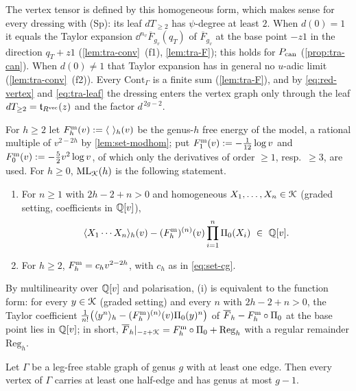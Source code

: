 The vertex tensor is defined by this homogeneous form, which makes sense for every dressing with (Sp): its leaf $dT_{\geq 2}$ has $\psi$-degree at least $2$. When $d(0) = 1$ it equals the Taylor expansion $\dd^{n_v}\overline F_{g_v}(q_T)$ of $\overline F_{g_v}$ at the base point $-z1$ in the direction $q_T+z1$ (\cref{lem:tra-conv}~(f1), \cref{lem:tra-F}); this holds for $P_{\mathrm{can}}$ (\cref{prop:tra-can}). When $d(0)\neq 1$ that Taylor expansion has in general no $u$-adic limit (\cref{lem:tra-conv}~(f2)). Every $\mathrm{Cont}_\Gamma$ is a finite sum (\cref{lem:tra-F}), and by \eqref{eq:red-vertex} and \eqref{eq:tra-leaf} the dressing enters the vertex graph only through the leaf $dT_{\geq 2} = \mathfrak{t}_{R^{\mathrm{vec}}}(z)$ and the factor $d^{\,2g-2}$.

\begin{defn}
\label{def:red-ML}
For $h\geq 2$ let $F^{\mathrm{m}}_h(v) := \langle\ \rangle_h(v)$ be the genus-$h$ free energy of the model, a rational multiple of $v^{2-2h}$ by \cref{lem:set-modhom}; put $F^{\mathrm{m}}_1(v) := -\frac{1}{12}\log v$ and $F^{\mathrm{m}}_0(v) := -\frac52v^2\log v$, of which only the derivatives of order $\geq 1$, resp.\ $\geq 3$, are used. For $h\geq 0$, $\mathrm{ML}_{\mathcal{K}}(h)$ is the following statement.
\begin{enumerate}
\item For $n\geq 1$ with $2h-2+n>0$ and homogeneous $X_1,\dots,X_n\in\mathcal{K}$ (graded setting, coefficients in $\mathbb{Q}[v]$),
\[
\langle X_1\cdots X_n\rangle_h(v)-(F^{\mathrm{m}}_h)^{(n)}(v)\prod_{i=1}^n\Pi_0(X_i)\ \in\ \mathbb{Q}[v] .
\]
\item For $h\geq 2$, $F^{\mathrm{m}}_h = c_hv^{2-2h}$, with $c_h$ as in \eqref{eq:set-cg}.
\end{enumerate}
By multilinearity over $\mathbb{Q}[v]$ and polarisation, (i) is equivalent to the function form: for every $y\in\mathcal{K}$ (graded setting) and every $n$ with $2h-2+n>0$, the Taylor coefficient $\frac1{n!}\bigl(\langle y^n\rangle_h-(F^{\mathrm{m}}_h)^{(n)}(v)\Pi_0(y)^n\bigr)$ of $\overline F_h-F^{\mathrm{m}}_h\circ\Pi_0$ at the base point lies in $\mathbb{Q}[v]$; in short, $\overline F_h|_{-z+\mathcal{K}} = F^{\mathrm{m}}_h\circ\Pi_0+\mathrm{Reg}_h$ with a regular remainder $\mathrm{Reg}_h$.
\end{defn}

\begin{lem}
\label{lem:red-genus}
Let $\Gamma$ be a leg-free stable graph of genus $g$ with at least one edge. Then every vertex of $\Gamma$ carries at least one half-edge and has genus at most $g-1$.
\end{lem}

